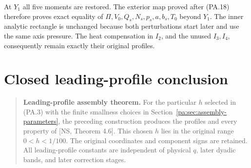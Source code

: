 \documentclass[10pt,a4paper]{article}
\begin{document}
At $Y_1$ all five moments are restored. The exterior map proved after (PA.18)
therefore proves exact equality of $\Pi,V_0,Q_s,N_s,p_s,a,b_s,T_0$ beyond
$Y_1$. The inner analytic rectangle is unchanged because both perturbations
start later and use the same axis pressure. The heat compensation in $I_2$,
and the unused $I_3,I_4$, consequently remain exactly their original profiles.

\section{Closed leading-profile conclusion}
\begin{quote}\textbf{Leading-profile assembly theorem.}
For the particular $h$ selected in (PA.3) with the finite smallness choices in
Section~\ref{pa:sec:assembly-parameters}, the preceding construction produces the profiles and every property
of [NS, Theorem 4.6]. This chosen $h$ lies in the original range $0<h<1/100$.
The original coordinates and component signs are retained. All leading-profile constants are independent of physical
$q$, later dyadic bands, and later correction stages.
\end{quote}
\end{document}
